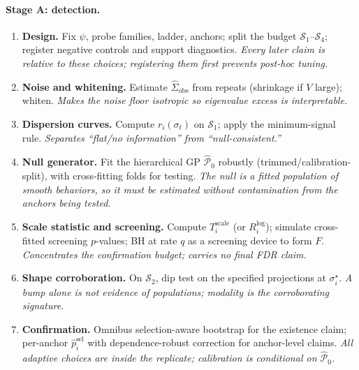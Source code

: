 \documentclass[11pt]{article}
\newcommand{\nullgen}{\widehat{\mathcal P}_0}
\begin{document}
\paragraph{Stage A: detection.}
\begin{enumerate}[label=\textbf{A\arabic*.},leftmargin=2.7em]
  \item \textbf{Design.} Fix \(\psi\), probe families, ladder, anchors; split the budget
  \(\mathcal S_1\)--\(\mathcal S_4\); register negative controls and support diagnostics.
  \emph{Every later claim is relative to these choices; registering them first prevents
  post-hoc tuning.}
  \item \textbf{Noise and whitening.} Estimate \(\widehat\Sigma_{\mathrm{obs}}\) from
  repeats (shrinkage if \(V\) large); whiten. \emph{Makes the noise floor isotropic so
  eigenvalue excess is interpretable.}
  \item \textbf{Dispersion curves.} Compute \(r_i(\sigma_t)\) on \(\mathcal S_1\); apply the
  minimum-signal rule. \emph{Separates ``flat/no information'' from ``null-consistent.''}
  \item \textbf{Null generator.} Fit the hierarchical GP \(\nullgen\) robustly
  (trimmed/calibration-split), with cross-fitting folds for testing. \emph{The null is a
  fitted population of smooth behaviors, so it must be estimated without contamination from
  the anchors being tested.}
  \item \textbf{Scale statistic and screening.} Compute \(T_i^{\mathrm{scale}}\) (or
  \(R_i^{\log}\)); simulate cross-fitted screening \(p\)-values; BH at rate \(q\) as a
  screening device to form \(F\). \emph{Concentrates the confirmation budget; carries no
  final FDR claim.}
  \item \textbf{Shape corroboration.} On \(\mathcal S_2\), dip test on the specified
  projections at \(\sigma_i^\star\). \emph{A bump alone is not evidence of populations;
  modality is the corroborating signature.}
  \item \textbf{Confirmation.} Omnibus selection-aware bootstrap for the existence claim;
  per-anchor \(\widehat p_i^{\mathrm{sel}}\) with dependence-robust correction for
  anchor-level claims. \emph{All adaptive choices are inside the replicate; calibration is
  conditional on \(\nullgen\).}
\end{enumerate}
\end{document}
